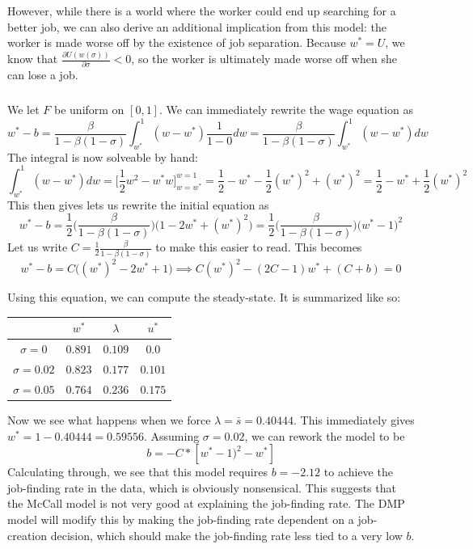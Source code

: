 \documentclass[12pt, letterpaper, parskip = full]{article}
\begin{document}
	However, while there is a world where the worker could end up searching for a better job, we can also derive an additional implication from this model: the worker is made worse off by the existence of job separation. Because \( w^* = U\), we know that \(\frac{\partial U(w(\sigma))}{\partial \sigma} < 0\), so the worker is ultimately made worse off when she can lose a job.

	\subsubsection{}

	We let \(F\) be uniform on \([0,1]\). We can immediately rewrite the wage equation as
	\[ w^* - b = \frac{\beta}{1 - \beta (1 - \sigma)} \int_{w^*}^{1} (w - w^*) \frac{1}{1 - 0} dw = \frac{\beta}{1 - \beta (1 - \sigma)} \int_{w^*}^{1} (w - w^*) dw   \]
	The integral is now solveable by hand:
	\[  \int_{w^*}^{1} (w - w^*) dw = \Bigg[\frac{1}{2} w^2 - w^* w \Bigg]_{w = w^*}^{w = 1} = \frac{1}{2} - w^* - \frac{1}{2} (w^*)^2 + (w^*)^2 = \frac{1}{2} - w^* + \frac{1}{2}(w^*)^2\]
	This then gives lets us rewrite the initial equation as 
	\[ w^* - b = \frac{1}{2}\Bigg(\frac{\beta}{1 - \beta (1 - \sigma)}\Bigg) \Bigg( 1 - 2w^* + (w^*)^2 \Bigg) = \frac{1}{2}\Bigg(\frac{\beta}{1 - \beta (1 - \sigma)}\Bigg) \Bigg( w^* - 1 \Bigg)^2  \]
	Let us write \(C = \frac{1}{2}\frac{\beta}{1 - \beta (1 - \sigma)}\) to make this easier to read. This becomes
	\[ w^* - b = C \Big((w^*)^2 - 2w^* + 1\Big) \implies C(w^*)^2 - (2C - 1) w^* + (C + b) = 0     \]

	Using this equation, we can compute the steady-state. It is summarized like so:

	\begin{center}
	\begin{tabular}{|c|c|c|c|}
		\hline
		& \( w^*  \) & \( \lambda \) & \( u^* \) \\
		\hline
		\(\sigma = 0\) & \( 0.891 \) & \(0.109\) & \(0.0\) \\
		\hline
		\(\sigma = 0.02\) & \( 0.823 \) & \(0.177\) & \(0.101\) \\
		\hline
		\(\sigma = 0.05\) & \( 0.764 \) & \(0.236\) & \(0.175\) \\
		\hline
	\end{tabular}
	\end{center}

	Now we see what happens when we force \( \lambda = \bar{s} = 0.40444  \). This immediately gives \(w^* = 1 - 0.40444 = 0.59556\). Assuming \(\sigma = 0.02\), we can rework the model to be
	\[ b = -C*[w^* - 1)^2 - w^*]     \] 
	Calculating through, we see that this model requires \(b = -2.12\) to achieve the job-finding rate in the data, which is obviously nonsensical. This suggests that the McCall model is not very good at explaining the job-finding rate. The DMP model will modify this by making the job-finding rate dependent on a job-creation decision, which should make the job-finding rate less tied to a very low \(b\).
	
\end{document}
